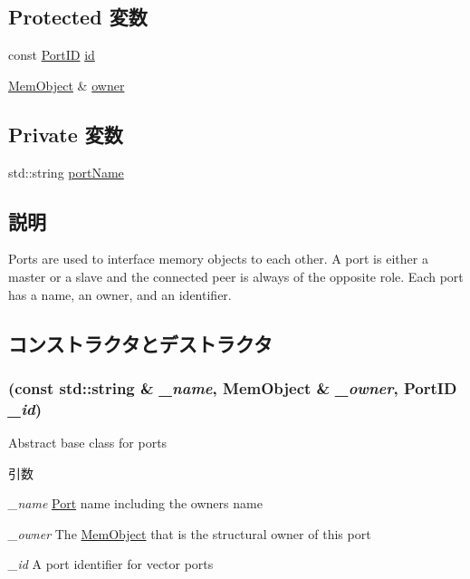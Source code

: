 \subsection*{Protected 変数}
\begin{DoxyCompactItemize}
\item 
const \hyperlink{base_2types_8hh_acef4d7d41cb21fdc252e20c04cd7bb8e}{PortID} \hyperlink{classPort_a0a67444fc1c33a60fe4a92bfff05d0cb}{id}
\item 
\hyperlink{classMemObject}{MemObject} \& \hyperlink{classPort_aba966efb6c1df4b015be3a396df6c318}{owner}
\end{DoxyCompactItemize}
\subsection*{Private 変数}
\begin{DoxyCompactItemize}
\item 
std::string \hyperlink{classPort_a3ba70989fe75b76393da3cbc6bdcf196}{portName}
\end{DoxyCompactItemize}


\subsection{説明}
Ports are used to interface memory objects to each other. A port is either a master or a slave and the connected peer is always of the opposite role. Each port has a name, an owner, and an identifier. 

\subsection{コンストラクタとデストラクタ}
\hypertarget{classPort_a569024a47504e9445c2030bd4b7f7b46}{
\subsubsection[{Port}]{ (const std::string \& {\em \_\-name}, \/  {\bf MemObject} \& {\em \_\-owner}, \/  {\bf PortID} {\em \_\-id})}}
\label{classPort_a569024a47504e9445c2030bd4b7f7b46}
Abstract base class for ports


\begin{DoxyParams}{引数}
\item[{\em \_\-name}]\hyperlink{classPort}{Port} name including the owners name \item[{\em \_\-owner}]The \hyperlink{classMemObject}{MemObject} that is the structural owner of this port \item[{\em \_\-id}]A port identifier for vector ports \end{DoxyParams}



